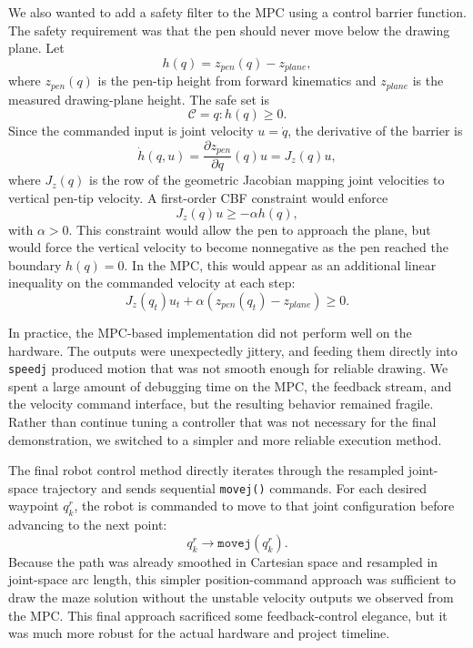\documentclass[11pt]{article}
\begin{document}
We also wanted to add a safety filter to the MPC using a control barrier function. The safety requirement was that the pen should never move below the drawing plane. Let
\begin{equation}
h(q) = z_{pen}(q) - z_{plane},
\end{equation}
where $z_{pen}(q)$ is the pen-tip height from forward kinematics and $z_{plane}$ is the measured drawing-plane height. The safe set is
\begin{equation}
\mathcal{C} = {q : h(q) \ge 0}.
\end{equation}
Since the commanded input is joint velocity $u = \dot q$, the derivative of the barrier is
\begin{equation}
\dot h(q,u) = \frac{\partial z_{pen}}{\partial q}(q) u
= J_z(q)u,
\end{equation}
where $J_z(q)$ is the row of the geometric Jacobian mapping joint velocities to vertical pen-tip velocity. A first-order CBF constraint would enforce
\begin{equation}
J_z(q)u \ge -\alpha h(q),
\end{equation}
with $\alpha > 0$. This constraint would allow the pen to approach the plane, but would force the vertical velocity to become nonnegative as the pen reached the boundary $h(q)=0$. In the MPC, this would appear as an additional linear inequality on the commanded velocity at each step:
\begin{equation}
J_z(q_t)u_t + \alpha \left(z_{pen}(q_t) - z_{plane}\right) \ge 0.
\end{equation}

In practice, the MPC-based implementation did not perform well on the hardware. The outputs were unexpectedly jittery, and feeding them directly into \texttt{speedj} produced motion that was not smooth enough for reliable drawing. We spent a large amount of debugging time on the MPC, the feedback stream, and the velocity command interface, but the resulting behavior remained fragile. Rather than continue tuning a controller that was not necessary for the final demonstration, we switched to a simpler and more reliable execution method.

The final robot control method directly iterates through the resampled joint-space trajectory and sends sequential \texttt{movej()} commands. For each desired waypoint $q_k^r$, the robot is commanded to move to that joint configuration before advancing to the next point:
\begin{equation}
q_k^r \longrightarrow \texttt{movej}(q_k^r).
\end{equation}
Because the path was already smoothed in Cartesian space and resampled in joint-space arc length, this simpler position-command approach was sufficient to draw the maze solution without the unstable velocity outputs we observed from the MPC. This final approach sacrificed some feedback-control elegance, but it was much more robust for the actual hardware and project timeline.
\end{document}

